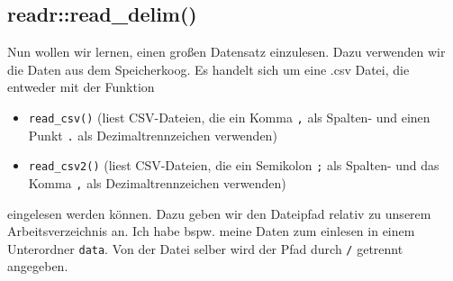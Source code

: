 \documentclass[
]{article}
\providecommand{\tightlist}{%
  \setlength{\itemsep}{0pt}\setlength{\parskip}{0pt}}
\begin{document}
\hypertarget{readrread_delim}{%
\subsection{readr::read\_delim()}\label{readrread_delim}}

Nun wollen wir lernen, einen großen Datensatz einzulesen. Dazu verwenden wir die Daten aus dem Speicherkoog. Es handelt sich um eine .csv Datei, die entweder mit der Funktion

\begin{itemize}
\tightlist
\item
  \texttt{read\_csv()} (liest CSV-Dateien, die ein Komma \texttt{,} als Spalten- und einen Punkt \texttt{.} als Dezimaltrennzeichen verwenden)
\item
  \texttt{read\_csv2()} (liest CSV-Dateien, die ein Semikolon \texttt{;} als Spalten- und das Komma \texttt{,} als Dezimaltrennzeichen verwenden)
\end{itemize}

eingelesen werden können. Dazu geben wir den Dateipfad relativ zu unserem Arbeitsverzeichnis an. Ich habe bspw. meine Daten zum einlesen in einem Unterordner \texttt{data}. Von der Datei selber wird der Pfad durch \texttt{/} getrennt angegeben.
\end{document}
